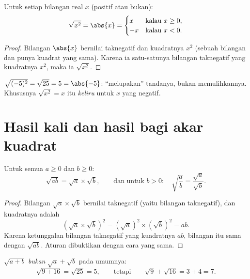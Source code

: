 \begin{proposition}\label{prop:g9:sqrt:square}
Untuk setiap bilangan real $x$ (positif atau bukan):
\[
\sqrt{x^2} = \abs{x} =
\begin{cases}
x & \text{kalau } x \geq 0,\\
-x & \text{kalau } x < 0 .
\end{cases}
\]
\end{proposition}

\begin{proof}
Bilangan $\abs{x}$ bernilai taknegatif dan kuadratnya $x^2$ (sebuah
bilangan dan  punya kuadrat yang sama). Karena ia
satu-satunya bilangan taknegatif yang kuadratnya $x^2$, maka ia
$\sqrt{x^2}$.
\end{proof}

\begin{example}
$\sqrt{(-5)^2} = \sqrt{25} = 5 = \abs{-5}$: 
``melupakan'' tandanya, bukan memulihkannya. Khususnya
$\sqrt{x^2} = x$ itu \emph{keliru} untuk $x$ yang negatif.
\end{example}

\section{Hasil kali dan hasil bagi akar kuadrat}

\begin{theorem}\label{thm:g9:sqrt:rules}
Untuk semua $a \geq 0$ dan $b \geq 0$:
\[
\sqrt{a b} = \sqrt a \times \sqrt b,
\qquad\text{dan untuk } b > 0:\quad
\sqrt{\frac ab} = \frac{\sqrt a}{\sqrt b} .
\]
\end{theorem}

\begin{proof}
Bilangan $\sqrt a \times \sqrt b$ bernilai taknegatif (yaitu  bilangan taknegatif), dan kuadratnya adalah
\[
\left(\sqrt a \times \sqrt b\right)^2
= \left(\sqrt a\right)^2 \times \left(\sqrt b\right)^2
= a b .
\]
Karena ketunggalan bilangan taknegatif yang kuadratnya $ab$, bilangan
itu sama dengan $\sqrt{ab}$. Aturan  dibuktikan dengan
cara yang sama.
\end{proof}

\begin{remark}
$\sqrt{a + b}$ \emph{bukan} $\sqrt a + \sqrt b$ pada umumnya:
\[
\sqrt{9 + 16} = \sqrt{25} = 5,
\qquad\text{tetapi}\qquad
\sqrt 9 + \sqrt{16} = 3 + 4 = 7 .
\]
\end{remark}

